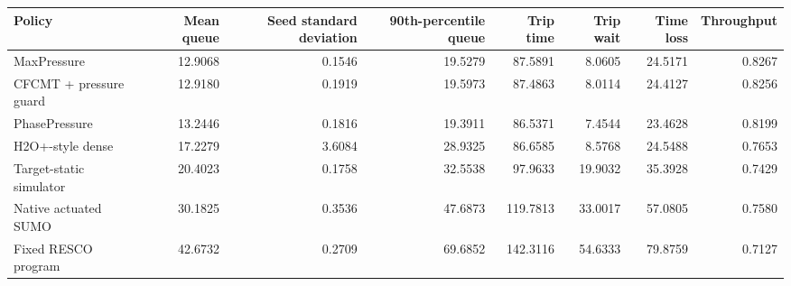 \begin{tabular}{lrrrrrrr}
\toprule
Policy & Mean queue & Seed standard deviation & 90th-percentile queue & Trip time & Trip wait & Time loss & Throughput \\
\midrule
MaxPressure & 12.9068 & 0.1546 & 19.5279 & 87.5891 & 8.0605 & 24.5171 & 0.8267 \\
CFCMT + pressure guard & 12.9180 & 0.1919 & 19.5973 & 87.4863 & 8.0114 & 24.4127 & 0.8256 \\
PhasePressure & 13.2446 & 0.1816 & 19.3911 & 86.5371 & 7.4544 & 23.4628 & 0.8199 \\
H2O+-style dense & 17.2279 & 3.6084 & 28.9325 & 86.6585 & 8.5768 & 24.5488 & 0.7653 \\
Target-static simulator & 20.4023 & 0.1758 & 32.5538 & 97.9633 & 19.9032 & 35.3928 & 0.7429 \\
Native actuated SUMO & 30.1825 & 0.3536 & 47.6873 & 119.7813 & 33.0017 & 57.0805 & 0.7580 \\
Fixed RESCO program & 42.6732 & 0.2709 & 69.6852 & 142.3116 & 54.6333 & 79.8759 & 0.7127 \\
\bottomrule
\end{tabular}
